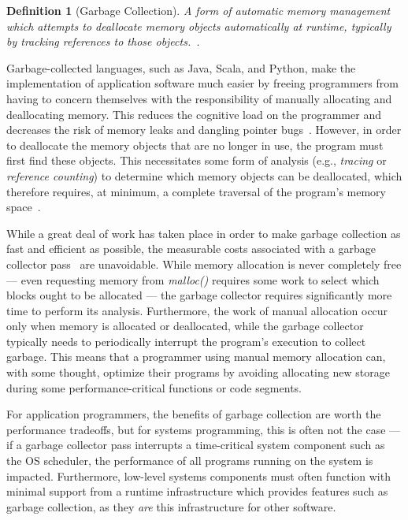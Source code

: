\documentclass[11pt,a4paper]{article}
\theoremstyle{break}
\newtheorem{defn}{Definition}
\begin{document}
\begin{defn}[Garbage Collection]
A form of automatic memory management which attempts to deallocate memory objects automatically at runtime, typically by tracking references to those objects.~\cite{Bartley:2003:GC:1074100.1074419,Dijkstra:1978:OGC:359642.359655}.
\end{defn}

Garbage-collected languages, such as Java, Scala, and Python, make the implementation of application software much easier by freeing programmers from having to concern themselves with the responsibility of manually allocating and deallocating memory. This reduces the cognitive load on the programmer and decreases the risk of memory leaks and dangling pointer bugs~\cite{Hertz:2005:QPG:1094811.1094836,Dijkstra:1978:OGC:359642.359655}. However, in order to deallocate the memory objects that are no longer in use, the program must first find these objects. This necessitates some form of analysis (e.g., \textit{tracing} or \textit{reference counting}) to determine which memory objects can be deallocated, which therefore requires, at minimum, a complete traversal of the program's memory space~\cite{Hertz:2005:QPG:1094811.1094836,Dijkstra:1978:OGC:359642.359655,Bartley:2003:GC:1074100.1074419}.

While a great deal of work has taken place in order to make garbage collection as fast and efficient as possible, the measurable costs associated with a garbage collector pass~\cite{Hertz:2005:QPG:1094811.1094836} are unavoidable. While memory allocation is never completely free --- even requesting memory from \textit{malloc()} requires some work to select which blocks ought to be allocated --- the garbage collector requires significantly more time to perform its analysis. Furthermore, the work of manual allocation occur only when memory is allocated or deallocated, while the garbage collector typically needs to periodically interrupt the program's execution to collect garbage. This means that a programmer using manual memory allocation can, with some thought, optimize their programs by avoiding allocating new storage during some performance-critical functions or code segments.

For application programmers, the benefits of garbage collection are worth the performance tradeoffs, but for systems programming, this is often not the case --- if a garbage collector pass interrupts a time-critical system component such as the OS scheduler, the performance of all programs running on the system is impacted. Furthermore, low-level systems components must often function with minimal support from a runtime infrastructure which provides features such as garbage collection, as they \textit{are} this infrastructure for other software.
\end{document}

